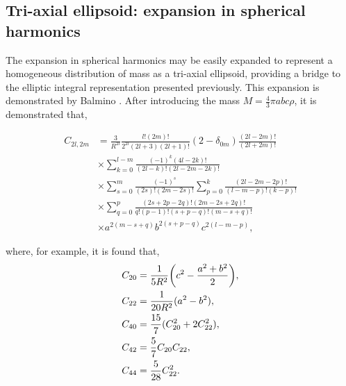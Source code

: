 
\subsection{Tri-axial ellipsoid: expansion in spherical harmonics}

The expansion in spherical harmonics may be easily expanded to represent a
homogeneous distribution of mass as a tri-axial ellipsoid, providing a bridge to
the elliptic integral representation presented previously. This expansion is
demonstrated by Balmino \cite{Geodesy1994}. After introducing the mass
$M=\frac{4}{3}\pi{abc\rho}$, it is demonstrated that,

\begin{equation}
    \begin{aligned}
        C_{2l,2m}&=\frac{3}{R^{2l}}\frac{l!(2m)!}{2^{2l}(2l+3)(2l+1)!}(2-\delta_{0m})\frac{(2l-2m)!}{(2l + 2m)!}\\
        &\times \sum_{k=0}^{l-m}\frac{(-1)^k(4l-2k)!}{(2l-k)!(2l-2m-2k)!}\\
        &\times
        \sum_{s=0}^{m}\frac{(-1)^s}{(2s)!(2m-2s)!}\sum_{p=0}^k\frac{(2l-2m-2p)!}{(l-m-p)!(k-p)!}\\
        &\times
        \sum_{q=0}^{p}\frac{(2s+2p-2q)!(2m-2s+2q)!}{q!(p-1)!(s+p-q)!(m-s+q)!}\\
        &\times a^{2(m-s+q)}b^{2(s+p-q)}c^{2(l-m-p)},
    \end{aligned}
\end{equation}

where, for example, it is found that,
\begin{equation}
    \begin{aligned}
        C_{20}&=\frac{1}{5R^2}\bigg(c^2-\frac{a^2+b^2}{2}\bigg),\\\vspace{3mm}
        C_{22}&=\frac{1}{20R^2}(a^2-b^2),\\\vspace{3mm}
        C_{40}&=\frac{15}{7}(C_{20}^2+2C_{22}^2),\\\vspace{3mm}
        C_{42}&=\frac{5}{7}C_{20}C_{22},\\\vspace{3mm}
        C_{44}&=\frac{5}{28}C_{22}^2.\\\vspace{3mm}
    \end{aligned}
\end{equation}

